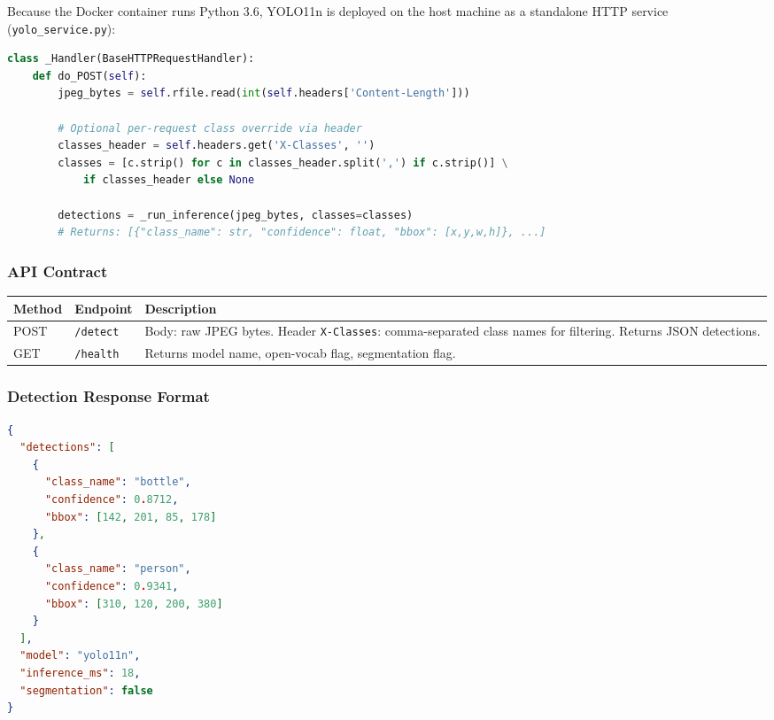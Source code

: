 \documentclass[12pt,a4paper]{report}
\begin{document}
Because the Docker container runs Python 3.6, YOLO11n is deployed on the host machine
as a standalone HTTP service (\texttt{yolo\_service.py}):

\begin{lstlisting}[language=Python, caption={YOLO service — inference endpoint (excerpt).}]
class _Handler(BaseHTTPRequestHandler):
    def do_POST(self):
        jpeg_bytes = self.rfile.read(int(self.headers['Content-Length']))

        # Optional per-request class override via header
        classes_header = self.headers.get('X-Classes', '')
        classes = [c.strip() for c in classes_header.split(',') if c.strip()] \
            if classes_header else None

        detections = _run_inference(jpeg_bytes, classes=classes)
        # Returns: [{"class_name": str, "confidence": float, "bbox": [x,y,w,h]}, ...]
\end{lstlisting}

\subsubsection{API Contract}

\begin{center}
\begin{tabularx}{\linewidth}{llX}
\toprule
\textbf{Method} & \textbf{Endpoint} & \textbf{Description} \\
\midrule
POST & \texttt{/detect} & Body: raw JPEG bytes. Header \texttt{X-Classes}: comma-separated class names for filtering. Returns JSON detections. \\
GET  & \texttt{/health} & Returns model name, open-vocab flag, segmentation flag. \\
\bottomrule
\end{tabularx}
\end{center}

\subsubsection{Detection Response Format}

\begin{lstlisting}[language=JSON, caption={Detection JSON response schema.}]
{
  "detections": [
    {
      "class_name": "bottle",
      "confidence": 0.8712,
      "bbox": [142, 201, 85, 178]
    },
    {
      "class_name": "person",
      "confidence": 0.9341,
      "bbox": [310, 120, 200, 380]
    }
  ],
  "model": "yolo11n",
  "inference_ms": 18,
  "segmentation": false
}
\end{lstlisting}
\end{document}
